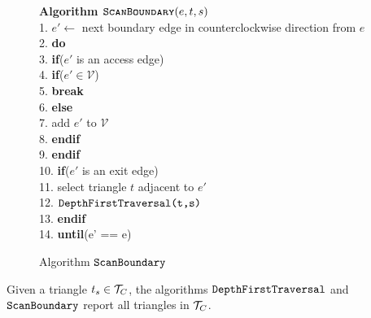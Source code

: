 {\begin{figure}[h]
{\begin{minipage}{0.90\linewidth}
  \textbf{Algorithm $\textsc{\texttt{ScanBoundary}}(e,t,s)$} \\
  1. \hspace{3pt} $e' \leftarrow$ next boundary edge in counterclockwise direction from $e$ \\
  2. \hspace{3pt} \textbf{do} \\
  3. \hspace{18pt} \textbf{if}($e'$ is an access edge) \\
  4. \hspace{33pt} \textbf{if}($e' \in \mathcal{V}$) \\
  5. \hspace{48pt} \textbf{break} \\
  6. \hspace{33pt} \textbf{else} \\
  7. \hspace{48pt} add $e'$ to $\mathcal{V}$ \\
  8. \hspace{33pt} \textbf{endif} \\
  9. \hspace{18pt} \textbf{endif} \\
  10. \hspace{15pt} \textbf{if}($e'$ is an exit edge) \\
  11. \hspace{30pt} select triangle $t$ adjacent to $e'$ \\
  12. \hspace{30pt} $\texttt{DepthFirstTraversal(t,s)}$ \\
  13. \hspace{15pt} \textbf{endif} \\
  14. \textbf{until}(e' == e) \\
  \end{minipage}
  }
  \caption{Algorithm $\texttt{ScanBoundary}$ }
  \label{fig:scanhandrail_alg}
  \end{figure}

  \begin{lemma}\label{lem:cc_holes_alg_correctness}
  Given a triangle $t_s \in {\mathcal{T}}_C$, the algorithms 
  $\texttt{DepthFirstTraversal}$ and $\texttt{ScanBoundary}$ report all
  triangles in ${\mathcal{T}}_C$.
  \end{lemma}

}
